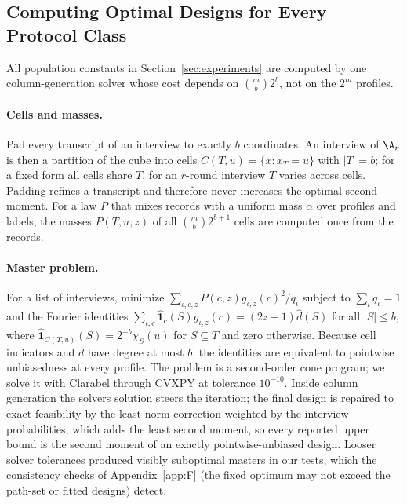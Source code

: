 \subsection{Computing Optimal Designs for Every Protocol Class}\label{app:engine}
All population constants in Section~\ref{sec:experiments} are computed by one column-generation solver whose cost depends on $\binom mb2^b$, not on the $2^m$ profiles.

\paragraph{Cells and masses.}
Pad every transcript of an interview to exactly $b$ coordinates. An interview of $\A_r$ is then a partition of the cube into cells $C(T,u)=\{x:x_T=u\}$ with $|T|=b$; for a fixed form all cells share $T$, for an $r$-round interview $T$ varies across cells. Padding refines a transcript and therefore never increases the optimal second moment. For a law $P$ that mixes records with a uniform mass $\alpha$ over profiles and labels, the masses $P(T,u,z)$ of all $\binom mb2^{b+1}$ cells are computed once from the records.

\paragraph{Master problem.}
For a list of interviews, minimize $\sum_{\iota,c,z}P(c,z)g_{\iota,z}(c)^2/q_\iota$ subject to $\sum_\iota q_\iota=1$ and the Fourier identities $\sum_{\iota,c}\widehat{\mathbf 1}_c(S)g_{\iota,z}(c)=(2z-1)\widehat d(S)$ for all $|S|\le b$, where $\widehat{\mathbf 1}_{C(T,u)}(S)=2^{-b}\chi_S(u)$ for $S\subseteq T$ and zero otherwise. Because cell indicators and $d$ have degree at most $b$, the identities are equivalent to pointwise unbiasedness at every profile. The problem is a second-order cone program; we solve it with Clarabel through CVXPY at tolerance $10^{-10}$. Inside column generation the solver\textquotesingle s solution steers the iteration; the final design is repaired to exact feasibility by the least-norm correction weighted by the interview probabilities, which adds the least second moment, so every reported upper bound is the second moment of an exactly pointwise-unbiased design. Looser solver tolerances produced visibly suboptimal masters in our tests, which the consistency checks of Appendix~\ref{app:F} (the fixed optimum may not exceed the path-set or fitted designs) detect.

